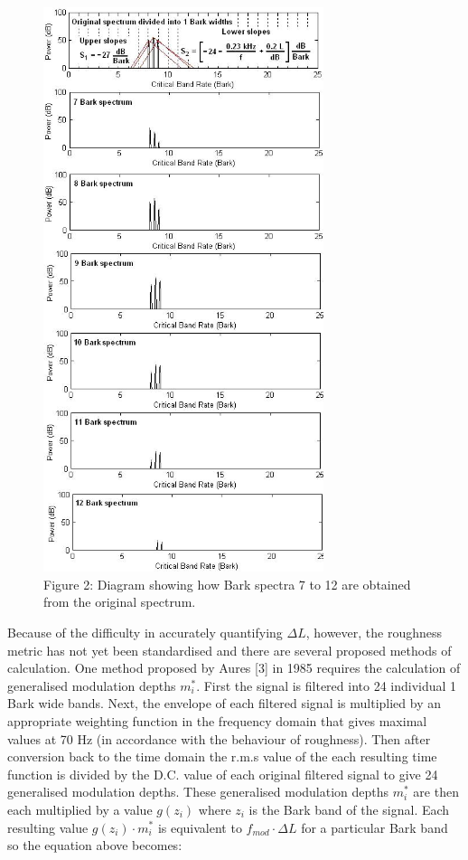 \begin{figure}[h!]
\centering
\includegraphics[width=3.225in]{img/roughness-bark-spectrums.jpg}
\caption*{Figure 2: Diagram showing how Bark spectra 7 to 12 are obtained from the
original spectrum.}
\end{figure}

\bigskip

Because of the difficulty in accurately quantifying $\Delta L$, however,
the roughness metric has not yet been standardised and there are several
proposed methods of calculation. One method proposed by Aures {[}3{]} in
1985 requires the calculation of generalised modulation depths
$m^*_i$. First the signal is filtered into 24 individual 1 Bark
wide bands. Next, the envelope of each filtered signal is multiplied by
an appropriate weighting function in the frequency domain that gives
maximal values at 70 Hz (in accordance with the behaviour of roughness).
Then after conversion back to the time domain the r.m.s value of the
each resulting time function is divided by the D.C. value of each
original filtered signal to give 24 generalised modulation depths. These
generalised modulation depths $m^*_i$ are then each multiplied by
a value $g(z_i)$ where $z_i$ is the Bark band of the signal. Each
resulting value $g(z_i) \cdot m^*_i$ is equivalent to $f_{mod}
\cdot \Delta L$ for a particular Bark band so the equation above becomes:


